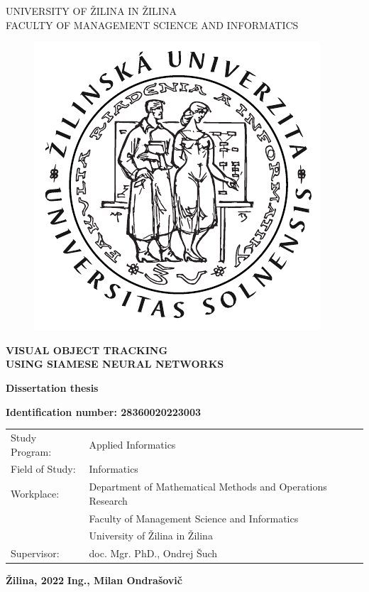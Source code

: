 \begin{titlepage}
    \begin{center}
        \normalsize
        UNIVERSITY OF ŽILINA IN ŽILINA\\
        FACULTY OF MANAGEMENT SCIENCE AND INFORMATICS\\

        \begin{figure}[!h]
            \centerline{\includegraphics[width=0.25\linewidth]{figures/formal_pages/FRI_logo.pdf}}
        \end{figure}

        \vfill

        \Large
        \textbf{VISUAL OBJECT TRACKING\\USING SIAMESE NEURAL NETWORKS}

        \textbf{Dissertation thesis}
        \large

        \textbf{Identification number: 28360020223003}
    \end{center}

    \vfill

    \small

    \begin{tabular}{ll}
        Study Program:  & Applied Informatics                                        \\[-2ex]
        Field of Study: & Informatics                                                \\[-2ex]
        Workplace:      & Department of Mathematical Methods and Operations Research \\[-2ex]
                        & Faculty of Management Science and Informatics              \\[-2ex]
                        & University of Žilina in Žilina                             \\[-2ex]
        Supervisor:     & doc. Mgr. PhD., Ondrej Šuch                                \\[-2ex]
    \end{tabular}

    \normalsize

    \vfill

    \textbf{Žilina, 2022} \hfill \textbf{Ing., Milan Ondrašovič}

\end{titlepage}